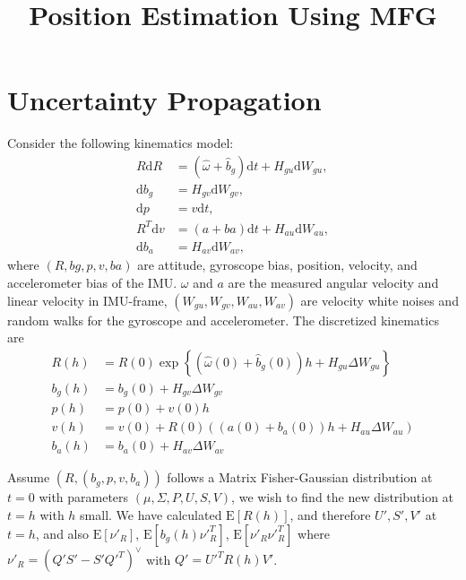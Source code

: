 \documentclass[10pt]{article}
\title{\vspace{-4ex}\textbf{Position Estimation Using MFG\vspace{-4ex}}}
\date{}
\newcommand{\expect}[1]{\ensuremath{\mathrm{E}\left[ #1 \right]}}
\newcommand{\diff}[1]{\ensuremath{\mathrm{d} #1}}
\begin{document}
\maketitle

\section{Uncertainty Propagation}

Consider the following kinematics model:
\begin{align}
	R\diff{R} &= (\hat{\omega}+\hat{b}_g)\diff{t} + H_{gu}\diff{W_{gu}}, \\
	\diff{b_g} &= H_{gv}\diff{W_{gv}}, \\
	\diff{p} &= v\diff{t}, \\
	R^T\diff{v} &= (a+ba)\diff{t} + H_{au}\diff{W_{au}}, \\
	\diff{b_a} &= H_{av}\diff{W_{av}},
\end{align}
where $(R,bg,p,v,ba)$ are attitude, gyroscope bias, position, velocity, and accelerometer bias of the IMU.
$\omega$ and $a$ are the measured angular velocity and linear velocity in IMU-frame, $(W_{gu},W_{gv},W_{au},W_{av})$ are velocity white noises and random walks for the gyroscope and accelerometer.
The discretized kinematics are
\begin{align}
	R(h) &= R(0)\exp\left\{ (\hat{\omega}(0) + \hat{b}_g(0))h + H_{gu}\Delta W_{gu} \right\} \\
	b_g(h) &= b_g(0) + H_{gv}\Delta W_{gv} \\
	p(h) &= p(0) + v(0)h \\
	v(h) &= v(0) + R(0)\left( (a(0)+b_a(0))h + H_{au}\Delta W_{au} \right)\\
	b_a(h) &= b_a(0) + H_{av}\Delta W_{av}
\end{align}

Assume $(R,(b_g,p,v,b_a))$ follows a Matrix Fisher-Gaussian distribution at $t=0$ with parameters $(\mu,\Sigma,P,U,S,V)$, we wish to find the new distribution at $t=h$ with $h$ small.
We have calculated $\expect{R(h)}$, and therefore $U',S',V'$ at $t=h$, and also $\expect{\nu'_R}$, $\expect{b_g(h)\nu'^T_R}$, $\expect{\nu'_R\nu'^T_R}$ where $\nu'_R = (Q'S'-S'Q'^T)^\vee$ with $Q' = U'^TR(h)V'$.
\end{document}
